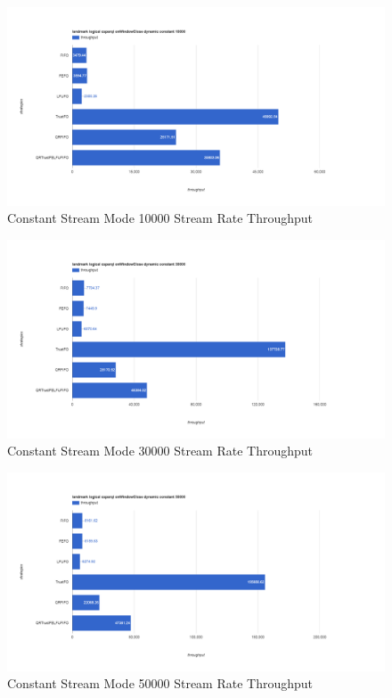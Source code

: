 \begin{figure}[!htbp]
    \centering
    \includegraphics[width=\textwidth]{img/app3-c-10000-t.png}
    \caption{Constant Stream Mode 10000 Stream Rate Throughput}
\end{figure}
\begin{figure}[!htbp]
    \centering
    \includegraphics[width=\textwidth]{img/app3-c-30000-t.png}
    \caption{Constant Stream Mode 30000 Stream Rate Throughput}
\end{figure}
\begin{figure}[!htbp]
    \centering
    \includegraphics[width=\textwidth]{img/app3-c-50000-t.png}
    \caption{Constant Stream Mode 50000 Stream Rate Throughput}
\end{figure}
